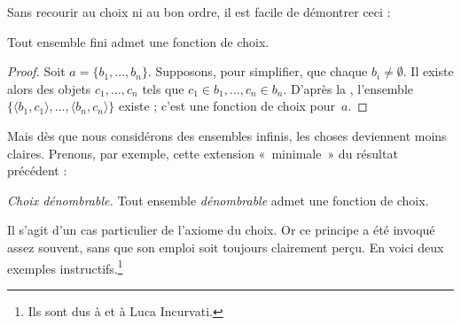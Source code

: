 \documentclass[../../../include/open-logic-section]{subfiles}
\begin{document}

Sans recourir au choix ni au bon ordre,
il est facile de démontrer ceci :

\begin{lem}
Tout ensemble fini admet une fonction de choix.
\end{lem}

\begin{proof}
Soit $a = \{b_1, \ldots, b_n\}$.
Supposons, pour simplifier, que chaque
$b_i \neq \emptyset$. Il existe alors
des objets $c_1, \ldots, c_n$ tels que
$c_1 \in b_1, \ldots, c_n \in b_n$.
D'après la
,
l'ensemble
$\{\langle b_1, c_1\rangle , \ldots,
\langle b_n, c_n\rangle\}$ existe ;
c'est une fonction de choix pour~$a$.
\end{proof}

Mais dès que nous considérons des ensembles
infinis, les choses deviennent moins claires.
Prenons, par exemple, cette extension
«~minimale~» du résultat précédent :

\begin{defish}
\emph{Choix dénombrable.} Tout ensemble
\emph{dénombrable} admet une fonction de choix.
\end{defish}

Il s'agit d'un cas particulier de l'axiome
du choix. Or ce principe a été invoqué
assez souvent, sans que son emploi soit
toujours clairement perçu. En voici deux
exemples instructifs.\footnote{Ils sont
dus à \citet[\S9.4]{Potter2004}
et à Luca Incurvati.}
\end{document}
